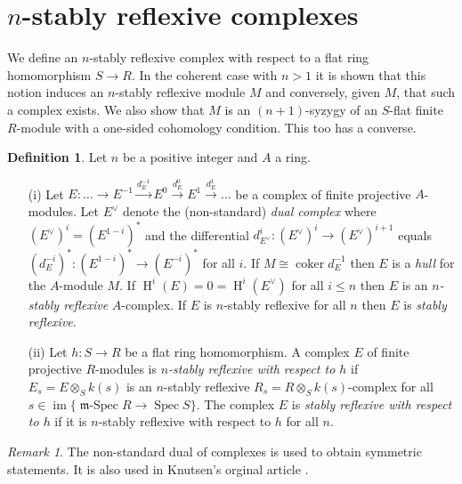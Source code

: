 \documentclass[a4paper,10pt]{amsart}
\theoremstyle{plain}
\theoremstyle{definition}
\newtheorem{defn}[xx]{Definition}%
\theoremstyle{remark}
\newtheorem{rem}[xx]{Remark}
\numberwithin{equation}{xx}
\DeclareMathOperator{\coker}{coker}
\DeclareMathOperator{\cH}{H}
\DeclareMathOperator{\im}{im}
\DeclareMathOperator{\mSpec}{\fr{m}-Spec}
\DeclareMathOperator{\Spec}{Spec}
\newcommand{\co}{\colon}
\newcommand{\ra}{\rightarrow}
\newcommand{\ot}{{\otimes}}
\renewcommand{\leq}{\leqslant}
\newcommand{\fr}[1]{\mathfrak{{#1}}}
\newcommand{\xra}[1]{\xrightarrow{{#1}}}
\begin{document}
\section{$n$-stably reflexive complexes}
We define an \(n\)-stably reflexive complex with respect to a flat ring homomorphism \(S\ra R\). In the coherent case with \(n>1\) it is shown that this notion induces an \(n\)-stably reflexive module \(M\) and conversely, given \(M\), that such a complex exists. We also show that \(M\) is an \((n{+}1)\)-syzygy of an \(S\)-flat finite \(R\)-module with a one-sided cohomology condition. This too has a converse. 
\begin{defn}\label{def.refcplx}
Let \(n\) be a positive integer and \(A\) a ring.
\begin{enumerate}
\item[(i)] Let \(E\co  \dots\ra E^{-1}\xra{d^{-1}_{E}} E^{0}\xra{d^{0}_{E}} E^{1}\xra{d^{1}_{E}}\dots\) be a complex of finite projective \(A\)-modules. Let \(E^{\vee}\) denote the (non-standard) \emph{dual complex} where \((E^{\vee})^{i}=(E^{1{-}i})^{*}\) and the differential \(d^{i}_{E^{\vee}}\co (E^{\vee})^{i}\ra (E^{\vee})^{i+1}\) equals \((d^{-i}_{E})^{*}\co (E^{1-i})^{*}\ra (E^{-i})^{*}\) for all \(i\). If \(M\cong\coker d^{-1}_{E}\) then \(E\) is a \emph{hull} for the \(A\)-module \(M\). If \(\cH^{i}(E)=0=\cH^{i}(E^{\vee})\) for all \(i\leq n\) then \(E\) is an \emph{\(n\)-stably reflexive} \(A\)-complex. If \(E\) is \(n\)-stably reflexive for all \(n\) then \(E\) is \emph{stably reflexive}.

\item[(ii)] Let \(h\co S\ra R\) be a flat ring homomorphism. A complex \(E\) of finite projective \(R\)-modules is \emph{\(n\)-stably reflexive with respect to \(h\)} if \(E_{s}=E\ot_{S}k(s)\) is an \(n\)-stably reflexive \(R_{s}=R\ot_{S}k(s)\)-complex for all \(s\in\im\{\mSpec R\ra\Spec S\}\). The complex \(E\) is \emph{stably reflexive with respect to \(h\)} if it is \(n\)-stably reflexive with respect to \(h\) for all \(n\).
\end{enumerate}
\end{defn} 
\begin{rem}\label{rem.refcplx}
The non-standard dual of complexes is used to obtain symmetric statements. It is also used in Knutsen's orginal article \cite{knu:83a}.
\end{rem}
\end{document}
